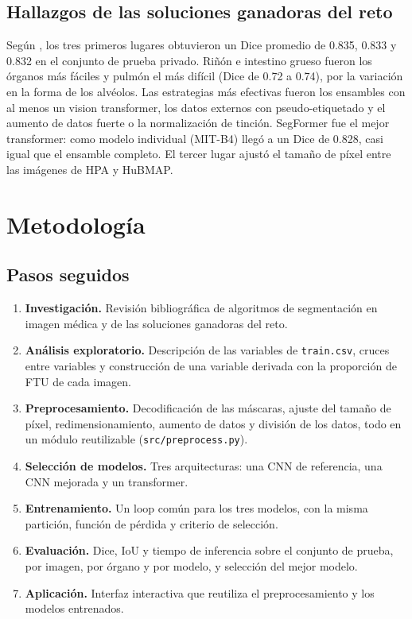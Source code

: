 \documentclass[11pt,letterpaper]{article}
\begin{document}
\subsection{Hallazgos de las soluciones ganadoras del reto}

Según \textcite{jain2023hacking}, los tres primeros lugares obtuvieron un Dice promedio de 0.835,
0.833 y 0.832 en el conjunto de prueba privado. Riñón e intestino grueso fueron los órganos más
fáciles y pulmón el más difícil (Dice de 0.72 a 0.74), por la variación en la forma de los alvéolos.
Las estrategias más efectivas fueron los ensambles con al menos un vision transformer, los datos
externos con pseudo-etiquetado y el aumento de datos fuerte o la normalización de tinción. SegFormer
fue el mejor transformer: como modelo individual (MIT-B4) llegó a un Dice de 0.828, casi igual que el
ensamble completo. El tercer lugar ajustó el tamaño de píxel entre las imágenes de HPA y HuBMAP.

\section{Metodología}\label{sec:metodologia}

\subsection{Pasos seguidos}

\begin{enumerate}
  \item \textbf{Investigación.} Revisión bibliográfica de algoritmos de segmentación en imagen
        médica y de las soluciones ganadoras del reto.
  \item \textbf{Análisis exploratorio.} Descripción de las variables de \texttt{train.csv}, cruces
        entre variables y construcción de una variable derivada con la proporción de FTU de cada
        imagen.
  \item \textbf{Preprocesamiento.} Decodificación de las máscaras, ajuste del tamaño de píxel,
        redimensionamiento, aumento de datos y división de los datos, todo en un módulo reutilizable
        (\texttt{src/\allowbreak preprocess.py}).
  \item \textbf{Selección de modelos.} Tres arquitecturas: una CNN de referencia, una CNN mejorada y
        un transformer.
  \item \textbf{Entrenamiento.} Un loop común para los tres modelos, con la misma partición, función
        de pérdida y criterio de selección.
  \item \textbf{Evaluación.} Dice, IoU y tiempo de inferencia sobre el conjunto de prueba, por imagen,
        por órgano y por modelo, y selección del mejor modelo.
  \item \textbf{Aplicación.} Interfaz interactiva que reutiliza el preprocesamiento y los modelos
        entrenados.
\end{enumerate}
\end{document}
